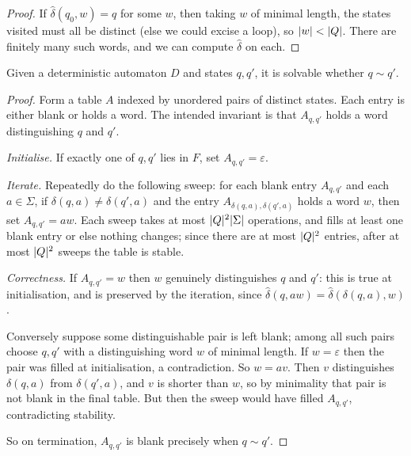 \documentclass[a4paper]{scrartcl}
\newcommand{\eps}{\varepsilon}
\begin{document}
\begin{proof}
	If $\hat\delta(q_0,w) = q$ for some $w$, then taking $w$ of minimal length, the states visited must all be distinct (else we could excise a loop), so $\lvert w\rvert < \lvert Q\rvert$. There are finitely many such words, and we can compute $\hat\delta$ on each.
\end{proof}

\begin{theorem}\label{thm:tablefilling}
	Given a deterministic automaton $D$ and states $q,q'$, it is solvable whether $q \sim q'$.
\end{theorem}

\begin{proof}
	Form a table $A$ indexed by unordered pairs of distinct states. Each entry is either blank or holds a word. The intended invariant is that $A_{q,q'}$ holds a word distinguishing $q$ and $q'$.

	\emph{Initialise.} If exactly one of $q,q'$ lies in $F$, set $A_{q,q'} = \eps$.

	\emph{Iterate.} Repeatedly do the following sweep: for each blank entry $A_{q,q'}$ and each $a \in \Sigma$, if $\delta(q,a) \neq \delta(q',a)$ and the entry $A_{\delta(q,a),\delta(q',a)}$ holds a word $w$, then set $A_{q,q'} = aw$. Each sweep takes at most $\lvert Q\rvert^2\lvert\Sigma\rvert$ operations, and fills at least one blank entry or else nothing changes; since there are at most $\lvert Q\rvert^2$ entries, after at most $\lvert Q\rvert^2$ sweeps the table is stable.

	\emph{Correctness.} If $A_{q,q'} = w$ then $w$ genuinely distinguishes $q$ and $q'$: this is true at initialisation, and is preserved by the iteration, since $\hat\delta(q,aw) = \hat\delta(\delta(q,a),w)$.

	Conversely suppose some distinguishable pair is left blank; among all such pairs choose $q,q'$ with a distinguishing word $w$ of minimal length. If $w = \eps$ then the pair was filled at initialisation, a contradiction. So $w = av$. Then $v$ distinguishes $\delta(q,a)$ from $\delta(q',a)$, and $v$ is shorter than $w$, so by minimality that pair is not blank in the final table. But then the sweep would have filled $A_{q,q'}$, contradicting stability.

	So on termination, $A_{q,q'}$ is blank precisely when $q \sim q'$.
\end{proof}
\end{document}
